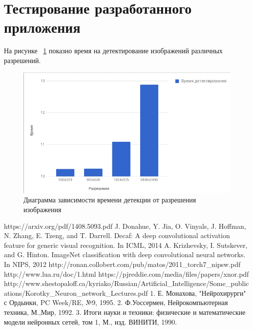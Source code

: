 \documentclass[a4paper,english,russian]{G2-105}
\begin{document}
\section{Тестирование разработанного приложения}
\par На рисунке ~\ref{timedetection} показно время на детектирование изображений различных разрешений.
\begin{figure}
    \includegraphics[width=0.9\linewidth]{timedetection.png}
    \caption{Диаграмма зависимости времени детекции от разрешения изображения}
	\label{timedetection}
\end{figure}
\newpage
{}
\newpage
\begin{thebibliography}{1}
     https://arxiv.org/pdf/1408.5093.pdf
     J. Donahue, Y. Jia, O. Vinyals, J. Hoffman, N. Zhang, E. Tzeng, and T. Darrell. Decaf: A deep convolutional activation feature for generic visual recognition. In ICML, 2014
  	  A. Krizhevsky, I. Sutskever, and G. Hinton. ImageNet
classification with deep convolutional neural networks. In
NIPS, 2012
	 http://ronan.collobert.com/pub/matos/2011\_torch7\_nipsw.pdf
	 http://www.lua.ru/doc/1.html
	 https://pjreddie.com/media/files/papers/xnor.pdf
	 http://www.shestopaloff.ca/kyriako/Russian/Artificial\_Intelligence/Some\_publications/Korotky\_Neuron\_network\_Lectures.pdf
	 1. Е. Монахова, "Нейрохирурги" с Ордынки, PC Week/RE, №9, 1995.
	2. Ф.Уоссермен, Нейрокомпьютерная техника, М.,Мир, 1992.
	3. Итоги науки и техники: физические и математические модели нейронных сетей, том
1, М., изд. ВИНИТИ, 1990.
\end{thebibliography}


\end{document}
